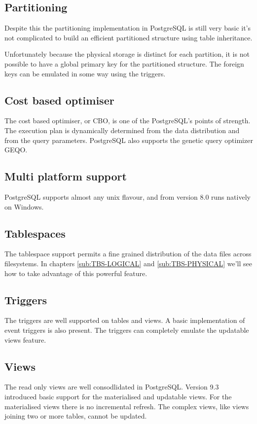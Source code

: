 \subsection{Partitioning}
Despite this the partitioning implementation in
PostgreSQL is still very basic it's not complicated to build an efficient partitioned structure 
using 
table inheritance.\newline

Unfortunately because the physical storage is distinct for each partition, it is not possible to 
have a global primary key for the partitioned structure. The foreign keys can be emulated in some 
way using the triggers.

\subsection{Cost based optimiser}
The cost based optimiser, or CBO, is one of the PostgreSQL's 
points of strength. The execution plan is dynamically determined from the data distribution and from 
the query parameters. PostgreSQL also supports the genetic query optimizer GEQO.


\subsection{Multi platform support}
PostgreSQL supports almost any unix flavour, and from version 8.0 runs natively on 
Windows.

\subsection{Tablespaces}
The tablespace support permits a fine grained distribution of the data files across
filesystems. In chapters \ref{sub:TBS-LOGICAL} and \ref{sub:TBS-PHYSICAL} we'll see how to take advantage of 
this powerful feature.

\subsection{Triggers} 
The triggers are well supported on tables and views. A basic implementation of event 
triggers is also present. The triggers can completely emulate the updatable views feature. 

\subsection{Views}
The read only views are well consodlidated in PostgreSQL.
Version 9.3 introduced basic support for the materialised and updatable views.
For the materialised views there is no incremental refresh. The complex views, like views 
joining two or more tables, cannot be updated. 

